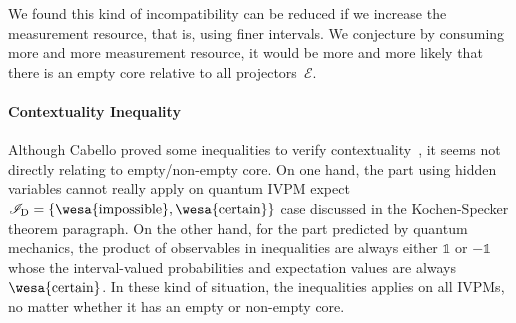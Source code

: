 \documentclass[english,reprint, aps, prl,superscriptaddress, showpacs,
showkeys, longbibliography, amsmath, amssymb]{revtex4-1}
\theoremstyle{plain}
\theoremstyle{definition}
\newcommand{\events}{\ensuremath{\mathcal{E}}}
\newcommand{\imposs}{{\text{\wesa{impossible}}}}
\newcommand{\necess}{{\text{\wesa{certain}}}}
\begin{document}
We found this kind of incompatibility can be reduced if we increase
the measurement resource, that is, using finer intervals. We conjecture
by consuming more and more measurement resource, it would be more
and more likely that there is an empty core relative to all projectors~$\events$.

\newpage{}

\paragraph{Contextuality Inequality}

Although Cabello proved some inequalities to verify contextuality~\cite{Cabello_2008},
it seems not directly relating to empty/non-empty core. On one hand,
the part using hidden variables cannot really apply on quantum IVPM
expect $\mathscr{I}_{\mathrm{D}}=\left\{ \imposs,\necess\right\} $
case discussed in the Kochen-Specker theorem paragraph. On the other
hand, for the part predicted by quantum mechanics, the product of
observables in inequalities are always either $\mathbb{1}$ or $-\mathbb{1}$
whose the interval-valued probabilities and expectation values are
always $\necess$. In these kind of situation, the inequalities applies
on all IVPMs, no matter whether it has an empty or non-empty core.


\end{document}
